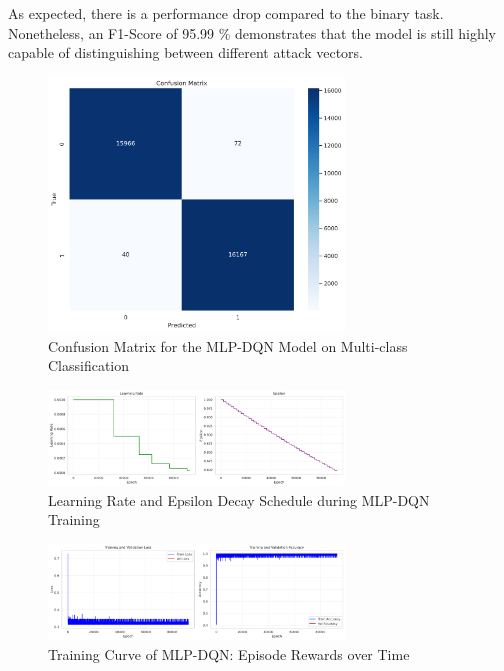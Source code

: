 \documentclass[16pt]{report}
\begin{document}
As expected, there is a performance drop compared to the binary task. Nonetheless, an F1-Score of 95.99 \% demonstrates that the model is still highly capable of distinguishing between different attack vectors.
\begin{figure}[H]
    \centering
    \includegraphics[width=0.7\textwidth]{images/dqn_nn_confusion_matrix.png}
    \caption{Confusion Matrix for the MLP-DQN Model on Multi-class Classification}
    \label{fig:dqn_conf_matrix}
\end{figure}

\begin{figure}[H]
    \centering
    \includegraphics[width=0.7\textwidth]{images/dqn_nn_lr_epsilon.png}
    \caption{Learning Rate and Epsilon Decay Schedule during MLP-DQN Training}
    \label{fig:lr_epsilon}
\end{figure}

\begin{figure}[H]
    \centering
    \includegraphics[width=0.7\textwidth]{images/dqn_nn_training_curves.png}
    \caption{Training Curve of MLP-DQN: Episode Rewards over Time}
    \label{fig:training_curve}
\end{figure}
\end{document}
